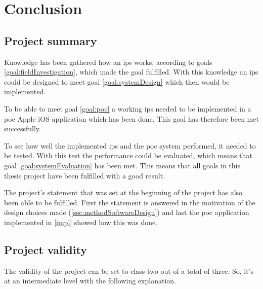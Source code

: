 \chapter{Conclusion}\label{conclusion}



\section{Project summary}\label{sec:conclusionProjectSummary}
Knowledge has been gathered how an \acrshort{ips} works, according to goals \ref{goal:fieldInvestigation}, which made the goal fulfilled.
With this knowledge an \acrshort{ips} could be designed to meet goal \ref{goal:systemDesign} which then would be implemented.

\bigskip

To be able to meet goal \ref{goal:poc} a working \acrshort{ips} needed to be implemented in a \acrfull{poc} Apple iOS application which has been done.
This goal has therefore been met successfully.

\bigskip

To see how well the implemented \acrshort{ips} and the \acrshort{poc} system performed, it needed to be tested.
With this test the performance could be evaluated, which means that goal \ref{goal:systemEvaluation} has been met.
This means that all goals in this thesis project have been fulfilled with a good result.

\bigskip

The project's statement that was set at the beginning of the project has also been able to be fulfilled.
First the statement is answered in the motivation of the design choices made (\cref{sec:methodSoftwareDesign}) and last the \acrshort{poc} application implemented in \cref{impl} showed how this was done.


\section{Project validity}\label{sec:conclusionProjectValidity}
The validity of the project can be set to class two out of a total of three.
So, it's at an intermediate level with the following explanation.

